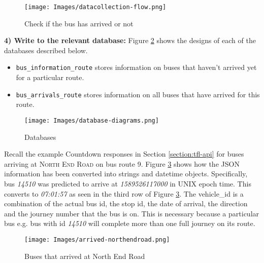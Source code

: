\begin{figure}[H]
\begin{center}
    \texttt{[image: Images/datacollection-flow.png]}
    \caption{Check if the bus has arrived or not}
    \label{fig:check-if-bus-arrived}
\end{center}
\end{figure}

\textbf{4) Write to the relevant database:} Figure \ref{fig:databases} shows the designs of each of the databases described below.

\begin{itemize}
    \item \texttt{bus\_information\_route} stores information on buses that haven't arrived yet for a particular route.
    \item \texttt{bus\_arrivals\_route} stores information on all buses that have arrived for this route. 
\end{itemize}

\begin{figure}[H]
\begin{center}
    \texttt{[image: Images/database-diagrams.png]}
    \caption{Databases}
    \label{fig:databases}
\end{center}
\end{figure}

Recall the example Countdown responses in Section \ref{section:tfl-api} for buses arriving at \textsc{North End Road} on bus route 9. Figure \ref{fig:arrived-database} shows how the JSON information has been converted into strings and datetime objects. Specifically, bus \textit{14510} was predicted to arrive at \textit{1589526117000} in UNIX epoch time. This converts to \textit{07:01:57} as seen in the third row of Figure \ref{fig:arrived-database}. The vehicle\_id is a combination of the actual bus id, the stop id, the date of arrival, the direction and the journey number that the bus is on. This is necessary because a particular bus e.g. bus with id \textit{14510} will complete more than one full journey on its route. \\

\begin{figure}[H]
\begin{center}
    \texttt{[image: Images/arrived-northendroad.png]}
    \caption{Buses that arrived at North End Road}
    \label{fig:arrived-database}
\end{center}
\end{figure}

